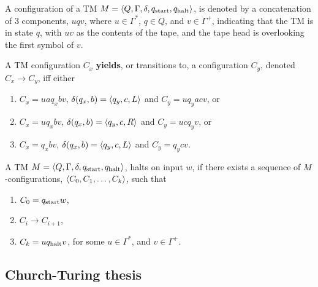 \begin{notation}

A configuration of a TM $M=\mathopen{}\left\langle{Q,\Gamma,\delta,\ensuremath{q_{\text{start}}},\ensuremath{q_{\text{halt}}}}\right\rangle\mathclose{}$, is denoted
by a concatenation of 3 components, $uqv$, where $u\in \Gamma^*$, $q\in Q$, and
$v\in \Gamma^+$, indicating that the TM is in state $q$, with $uv$ as the
contents of the tape, and the tape head is overlooking the first symbol of $v$.

\end{notation}

\begin{definition}

A TM configuration $C_x$ \textbf{yields}, or transitions to, a configuration
$C_y$, denoted $C_x\rightarrow C_y$, iff either

\begin{enumerate}

\item $C_x=uaq_xbv$, $\delta\mathopen{}\left({q_x,b}\right)\mathclose{}=\mathopen{}\left\langle{q_y,c,L}\right\rangle\mathclose{}$ and $C_y=uq_yacv$, or

\item $C_x=uq_xbv$, $\delta\mathopen{}\left({q_x,b}\right)\mathclose{}=\mathopen{}\left\langle{q_y,c,R}\right\rangle\mathclose{}$ and $C_y=ucq_yv$, or

\item $C_x=q_xbv$, $\delta\mathopen{}\left({q_x,b}\right)\mathclose{}=\mathopen{}\left\langle{q_y,c,L}\right\rangle\mathclose{}$ and $C_y=q_ycv$.

\end{enumerate}

\end{definition}

\begin{definition}

A TM $M=\mathopen{}\left\langle{Q,\Gamma,\delta,\ensuremath{q_{\text{start}}},\ensuremath{q_{\text{halt}}}}\right\rangle\mathclose{}$, halts on input $w$, if there
exists a sequence of $M$-configurations, $\mathopen{}\left\langle{C_0,C_1, \ldots, C_k}\right\rangle\mathclose{}$, such
that

\begin{enumerate}

\item $C_0=q_{\text{start}} w$,

\item $C_i\rightarrow C_{i+1}$,

\item $C_k=uq_{\text{halt}} v$, for some $u\in\Gamma^*$, and $v\in\Gamma^+$.

\end{enumerate}

\end{definition}

\subsection{Church-Turing thesis}

